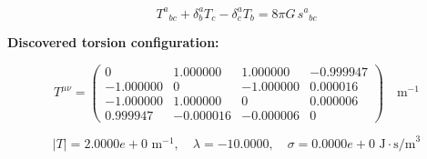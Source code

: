 
\begin{equation}
  T^a{}_{bc} + \delta^a_b T_c - \delta^a_c T_b = 8\pi G \, s^a{}_{bc}
\end{equation}

\textbf{Discovered torsion configuration:}

\begin{equation}
  T^{\mu\nu} = \begin{pmatrix}
    0 & 1.000000 & 1.000000 & -0.999947 \\
    -1.000000 & 0 & -1.000000 & 0.000016 \\
    -1.000000 & 1.000000 & 0 & 0.000006 \\
    0.999947 & -0.000016 & -0.000006 & 0
  \end{pmatrix} \quad \text{m}^{-1}
\end{equation}

\begin{equation}
  |T| = 2.0000e+0 \text{ m}^{-1}, \quad
  \lambda = -10.0000, \quad
  \sigma = 0.0000e+0 \text{ J}\cdot\text{s/m}^3
\end{equation}